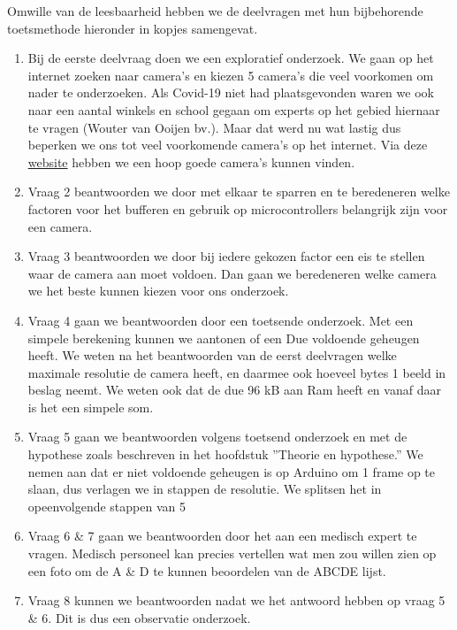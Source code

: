 \documentclass{article}
\begin{document}
Omwille van de leesbaarheid hebben we de deelvragen met hun bijbehorende toetsmethode hieronder in kopjes samengevat.


\begin{enumerate}
	\item Bij de eerste deelvraag doen we een exploratief onderzoek. We gaan op het internet zoeken naar camera’s en kiezen 5 camera’s die veel voorkomen om nader te onderzoeken. Als Covid-19 niet had plaatsgevonden waren we ook naar een aantal winkels en school gegaan om experts op het gebied hiernaar te vragen (Wouter van Ooijen bv.). Maar dat werd nu wat lastig dus beperken we ons tot veel voorkomende camera’s op het internet. Via deze \href{https://www.open-electronics.org/a-complete-guide-to-arduino-based-video-camera/}{website} hebben we een hoop goede camera’s kunnen vinden.
	\item Vraag 2 beantwoorden we door met elkaar te sparren en te beredeneren welke factoren voor het bufferen en gebruik op microcontrollers belangrijk zijn voor een camera.
	\item Vraag 3 beantwoorden we door bij iedere gekozen factor een eis te stellen waar de camera aan moet voldoen. Dan gaan we beredeneren welke camera we het beste kunnen kiezen voor ons onderzoek.
	\item Vraag 4 gaan we beantwoorden door een toetsende onderzoek. Met een simpele berekening kunnen we aantonen of een Due voldoende geheugen heeft. We weten na het beantwoorden van de eerst deelvragen welke maximale resolutie de camera heeft, en daarmee ook hoeveel bytes 1 beeld in beslag neemt. We weten ook dat de due 96 kB aan Ram heeft en vanaf daar is het een simpele som.
	\item Vraag 5 gaan we beantwoorden volgens toetsend onderzoek en met de hypothese zoals beschreven in het hoofdstuk ”Theorie en hypothese.” We nemen aan dat er niet voldoende geheugen is op Arduino om 1 frame op te slaan, dus verlagen we in stappen de resolutie. We splitsen het in opeenvolgende stappen van 5%
	\item Vraag 6 \& 7 gaan we beantwoorden door het aan een medisch expert te vragen. Medisch personeel kan precies vertellen wat men zou willen zien op een foto om de A \& D te kunnen beoordelen van de ABCDE lijst.
	\item Vraag 8 kunnen we beantwoorden nadat we het antwoord hebben op vraag 5 \& 6. Dit is dus een observatie onderzoek.

\end{enumerate}
\end{document}
